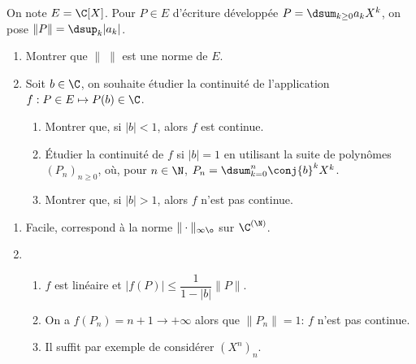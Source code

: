 \begin{enonce}
\begin{exercise}[ID={RMS134 E1462},subtitle={CCINP MP 2023},theme={analyse},concours={ccinp},annee={2023},filiere={MP}, difficulty={0}]
  On note $E=\C[X]$. Pour $P\in E$ d'écriture développée
  $P=\dsum_{k\ge 0}a_kX^k$, on pose $\|P\|=\dsup_{k}|a_k|$.
  \begin{enumerate}
  \item Montrer que $\|\;\|$ est une norme de $E$.
  \item Soit $b\in\C$, on souhaite étudier la continuité de
    l'application $f:P\in E\mapsto P(b)\in\C$.
    \begin{enumerate}
    \item Montrer que, si $|b|<1$, alors $f$ est continue.
    \item Étudier la continuité de $f$ si $|b|=1$ en utilisant la
      suite de polynômes $(P_n)_{n\ge 0}$, où, pour $n\in\N$,
      $P_n=\dsum_{k=0}^n\conj{b}^kX^k$.
    \item Montrer que, si $|b|>1$, alors $f$ n'est pas continue.
    \end{enumerate}
  \end{enumerate}
\end{exercise}
\begin{solution}
  \begin{enumerate}
  \item Facile, correspond à la norme $\|\cdot\|_{\inftyø}$ sur $\C^{(\N)}$.
  \item
    \begin{enumerate}
    \item $f$ est linéaire et $|f(P)|\le \dfrac1{1-|b|}\|P\|$.
    \item On a $f(P_n)=n+1\to +\infty$ alors que $\|P_n\|=1$: $f$
      n'est pas continue.
    \item Il suffit par exemple de considérer $(X^n)_n$. 
    \end{enumerate}
  \end{enumerate}
\end{solution}
\end{enonce}